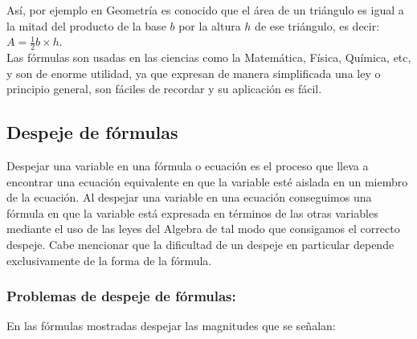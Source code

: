 \documentclass[a5paper,pagesize,10pt,bibtotoc,pointlessnumbers,
normalheadings,DIV=9,fleqn,x11names,table,twoside=false]{scrbook}
\begin{document}
Así, por ejemplo en Geometría es conocido que el área de un triángulo es igual a la mitad del producto de la base $b$ por la 
altura $h$ de ese triángulo, es decir: $A = \frac{1}{2}b\times h$.\\

Las fórmulas son usadas en las ciencias como la Matemática, Física, Química, etc, y son de enorme utilidad, ya que expresan de 
manera simplificada una ley o principio general, son fáciles de recordar y su aplicación es fácil.

\subsection{Despeje de fórmulas}

Despejar una variable en una fórmula o ecuación es el proceso que lleva a encontrar una ecuación equivalente en que la variable 
esté aislada en un miembro de la ecuación. Al despejar una variable en una ecuación conseguimos una fórmula en que la variable 
está expresada en términos de las otras variables mediante el uso de las leyes del Algebra de tal modo que consigamos el correcto 
despeje. Cabe mencionar que la dificultad de un despeje en particular depende exclusivamente de la forma de la fórmula.  


\subsubsection{Problemas de despeje de fórmulas:}

En las fórmulas mostradas despejar las magnitudes que se señalan:
\end{document}

